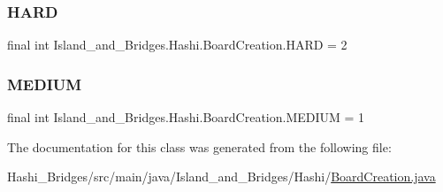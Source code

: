 \subsubsection{\texorpdfstring{H\+A\+RD}{HARD}}
{\footnotesize\ttfamily final int Island\+\_\+and\+\_\+\+Bridges.\+Hashi.\+Board\+Creation.\+H\+A\+RD = 2\hspace{0.3cm}{\ttfamily [static]}}

\mbox{\label{class_island__and___bridges_1_1_hashi_1_1_board_creation_a49731fcc28b62e76d5663ab6965b2128}} 
\subsubsection{\texorpdfstring{M\+E\+D\+I\+UM}{MEDIUM}}
{\footnotesize\ttfamily final int Island\+\_\+and\+\_\+\+Bridges.\+Hashi.\+Board\+Creation.\+M\+E\+D\+I\+UM = 1\hspace{0.3cm}{\ttfamily [static]}}



The documentation for this class was generated from the following file\+:\begin{DoxyCompactItemize}
\item 
Hashi\+\_\+\+Bridges/src/main/java/\+Island\+\_\+and\+\_\+\+Bridges/\+Hashi/\mbox{\hyperlink{_board_creation_8java}{Board\+Creation.\+java}}\end{DoxyCompactItemize}
